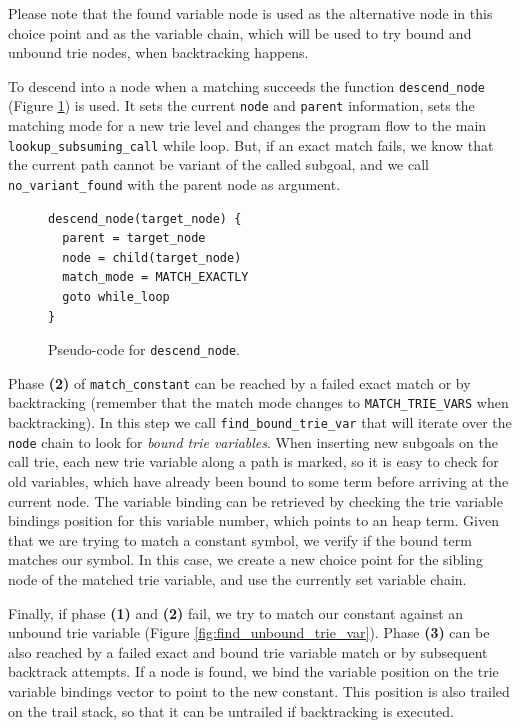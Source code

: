 Please note that the found variable node is used as the alternative node in this choice point
and as the variable chain, which will be used to try bound and unbound trie nodes, when backtracking happens.

To descend into a node when a matching succeeds the function \texttt{descend\_node} (Figure \ref{fig:descend_node})
is used. It sets the current \texttt{node} and \texttt{parent} information, sets the matching mode for a new trie level
and changes the program flow to the main \texttt{lookup\_subsuming\_call} while loop. But,
if an exact match fails, we know that the current path cannot be variant of the called subgoal, and we call
\texttt{no\_variant\_found} with the parent node as argument.

\begin{figure}[ht]
\begin{Verbatim}
descend_node(target_node) {
  parent = target_node
  node = child(target_node)
  match_mode = MATCH_EXACTLY
  goto while_loop
}
\end{Verbatim}
\caption{Pseudo-code for \texttt{descend\_node}.}
\label{fig:descend_node}
\end{figure}

Phase \textbf{(2)} of \texttt{match\_constant} can be reached by a failed exact match or by backtracking
(remember that the match mode changes to \texttt{MATCH\_TRIE\_VARS} when backtracking). In this step
we call \texttt{find\_bound\_trie\_var} that will iterate over the \texttt{node} chain to look for
\textit{bound trie variables}. When inserting new subgoals on the call trie, each new trie variable
along a path is marked, so it is easy to check for old variables, which have already been bound
to some term before arriving at the current node. The variable binding can be retrieved by
checking the trie variable bindings position for this variable number, which points to an heap term.
Given that we are trying to match a constant symbol, we verify if the bound term matches our symbol.
In this case, we create a new choice point for the sibling node of the matched trie variable, and use
the currently set variable chain.

Finally, if phase \textbf{(1)} and \textbf{(2)} fail, we try to match our constant against an unbound trie variable
(Figure \ref{fig:find_unbound_trie_var}).
Phase \textbf{(3)} can be also reached by a failed exact and bound trie variable match or by subsequent backtrack
attempts. If a node is found, we bind the variable position on the trie variable bindings
vector to point to the new constant. This position is also trailed on the trail stack, so that it can be untrailed
if backtracking is executed.

